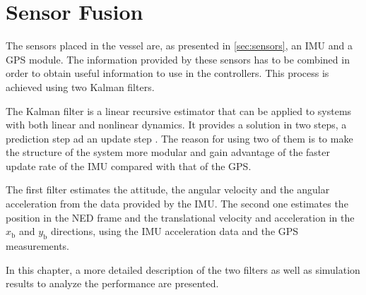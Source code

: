 \chapter{Sensor Fusion}\label{chap:sensorFusion}
The sensors placed in the vessel are, as presented in \autoref{sec:sensors}, an IMU and a GPS module. The information provided by these sensors has to be combined in order to obtain useful information to use in the controllers. This process is achieved using two Kalman filters. 

The Kalman filter is a linear recursive estimator that can be applied to systems with both linear and nonlinear dynamics. It provides a solution in two steps, a prediction step ad an update step \cite{SHaykin}. The reason for using two of them is to make the structure of the system more modular and gain advantage of the faster update rate of the IMU compared with that of the GPS.

The first filter estimates the attitude, the angular velocity and the angular acceleration from the data provided by the IMU. The second one estimates the position in the NED frame and the translational velocity and acceleration in the $x_\mathrm{b}$ and $y_\mathrm{b}$ directions, using the IMU acceleration data and the GPS measurements.

In this chapter, a more detailed description of the two filters as well as simulation results to analyze the performance are presented.